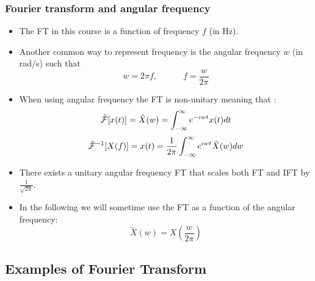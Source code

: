   \frametitle{Fourier transform and angular frequency}
  \begin{itemize}
  \item The FT in this course is a function of frequency $f$ (in Hz).
  \item Another common way to represent frequency is the angular frequency $w$ (in rad/s) such that
$$w=2\pi f,\quad \quad\quad f=\frac{w}{2\pi}$$
\item When using angular frequency the FT is non-unitary meaning that :
 $$   \mathcal{\tilde F}[x(t)]= \tilde X(w) = \int_{-\infty}^\infty e^{- i w t} x(t) d t  $$
 $$   \mathcal{\tilde F}^{-1}[X(f)] = x(t)= \frac{1}{2\pi}\int_{-\infty}^\infty e^{ i w t} \tilde X(w) d w $$
 \item There exists a unitary angular frequency FT that scales both FT and IFT by $\frac{1}{\sqrt{2\pi}}$.
  \item In the following we will sometime use the FT as a function of the angular frequency:
  $$ \tilde X(w)=X\left(\frac{w}{2\pi}\right)$$

  \end{itemize}

  \subsection{Examples of Fourier Transform}
  \label{sec:}

